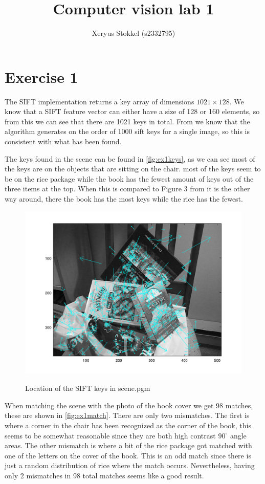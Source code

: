 \documentclass[a4paper]{article}
\title{Computer vision lab 1}
\author{Xeryus Stokkel (s2332795)}
\begin{document}
\maketitle

\section{Exercise 1}

The SIFT implementation returns a key array of dimensions $1021 \times 128$. We know that a SIFT feature vector can either have a size of 128 or 160 elements, so from this we can see that there are 1021 keys in total. From \cite{lowe1999object} we know that the algorithm generates on the order of 1000 sift keys for a single image, so this is consistent with what has been found.

The keys found in the scene can be found in \autoref{fig:ex1keys}, as we can see most of the keys are on the objects that are sitting on the chair. most of the keys seem to be on the rice package while the book has the fewest amount of keys out of the three items at the top. When this is compared to Figure 3 from \cite{lowe1999object} it is the other way around, there the book has the most keys while the rice has the fewest.
\begin{figure}[h]
	\centering
	\includegraphics[width=.7\textwidth]{ex1keys}
	\label{fig:ex1keys}
	\caption{Location of the SIFT keys in scene.pgm}
\end{figure}

When matching the scene with the photo of the book cover we get 98 matches, these are shown in \autoref{fig:ex1match}. There are only two mismatches. The first is where a corner in the chair has been recognized as the corner of the book, this seems to be somewhat reasonable since they are both high contrast $90^\circ$ angle areas. The other mismatch is where a bit of the rice package got matched with one of the letters on the cover of the book. This is an odd match since there is just a random distribution of rice where the match occurs. Nevertheless, having only 2 mismatches in 98 total matches seems like a good result.
\end{document}

